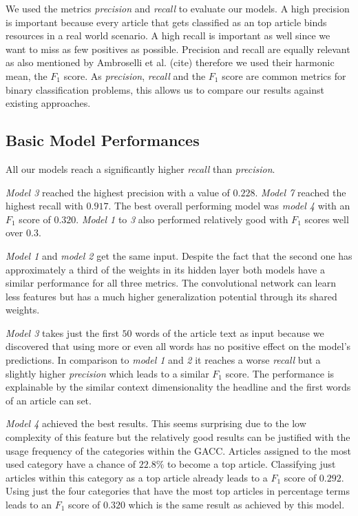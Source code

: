 We used the metrics \textit{precision} and \textit{recall} to evaluate our models. A high precision is important because every article that gets classified as an top article binds resources in a real world scenario. A high recall is important as well since we want to miss as few positives as possible. Precision and recall are equally relevant as also mentioned by Ambroselli et al. (cite) therefore we used their harmonic mean, the $F_1$ score.
As \textit{precision}, \textit{recall} and the $F_1$ score are common metrics for binary classification problems, this allows us to compare our results against existing approaches.

\subsection{Basic Model Performances}
All our models reach a significantly higher \textit{recall} than \textit{precision}.

\textit{Model 3} reached the highest precision with a value of $0.228$. \textit{Model 7} reached the highest recall with $0.917$. The best overall performing model was \textit{model 4} with an $F_1$ score of $0.320$. \textit{Model 1} to \textit{3} also performed relatively good with $F_1$ scores well over $0.3$.

\textit{Model 1} and \textit{model 2} get the same input. Despite the fact that the second one has approximately a third of the weights in its hidden layer both models have a similar performance for all three metrics.
The convolutional network can learn less features but has a much higher generalization potential through its shared weights.

\textit{Model 3} takes just the first $50$ words of the article text as input because we discovered that using more or even all words has no positive effect on the model's predictions. In comparison to \textit{model 1} and \textit{2} it reaches a worse \textit{recall} but a slightly higher \textit{precision} which leads to a similar $F_1$ score.
The performance is explainable by the similar context dimensionality the headline and the first words of an article can set.

\textit{Model 4} achieved the best results. This seems surprising due to the low complexity of this feature but the relatively good results can be justified with the usage frequency of the categories within the GACC. Articles assigned to the most used category have a chance of $22.8\%$ to become a top article. Classifying just articles within this category as a top article already leads to a $F_1$ score of $0.292$. Using just the four categories that have the most top articles in percentage terms leads to an $F_1$ score of $0.320$ which is the same result as achieved by this model.

